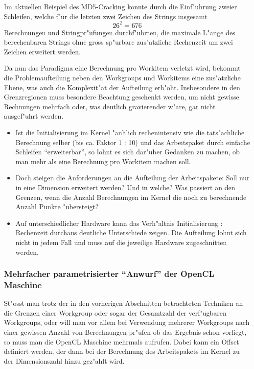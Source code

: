 \begin{refsection}
Im aktuellen Beispiel des MD5-Cracking konnte durch die Einf"uhrung zweier
Schleifen, welche f"ur die letzten zwei Zeichen des Strings insgesamt 
\[ 26^2 = 676 \] Berechnungen und Stringpr"ufungen durchf"uhrten, die 
maximale L"ange des berechenbaren Strings ohne gross sp"urbare zus"atzliche
Rechenzeit um zwei Zeichen erweitert werden.

Da nun das Paradigma eine Berechnung pro Workitem verletzt wird, bekommt
die Problemaufteilung neben den Workgroups und Workitems eine zus"atzliche 
Ebene, was auch die Komplexit"at der Aufteilung erh"oht. Insbesondere in 
den Grenzregionen muss besondere Beachtung geschenkt werden, um nicht
gewisse Rechnungen mehrfach oder, was deutlich gravierender w"are, gar nicht
ausgef"uhrt werden.

\begin{itemize}
 \item Ist die Initialisierung im Kernel "anhlich rechenintensiv wie die
       tats"achliche Berechnung selber (bis ca. Faktor 1 : 10) und das 
       Arbeitspaket durch einfache Schleifen ``erweiterbar'', so lohnt
       es sich dar"uber Gedanken zu machen, ob man mehr als eine Berechnung
       pro Workitem machen soll.
 \item Doch steigen die Anforderungen an die Aufteilung der Arbeitspakete:
       Soll nur in eine Dimension erweitert werden? Und in welche? Was 
       passiert an den Grenzen, wenn die Anzahl Berechnungen im Kernel die 
       noch zu berechnende Anzahl Punkte "ubersteigt?
 \item Auf unterschiedlicher Hardware kann das Verh"altnis Initialisierung : 
       Rechenzeit durchaus deutliche Unterschiede zeigen. Die Aufteilung
       lohnt sich nicht in jedem Fall und muss auf die jeweilige Hardware
       zugeschnitten werden.
\end{itemize}




\subsubsection{Mehrfacher parametrisierter ``Anwurf'' der OpenCL Maschine}

St"osst man trotz der in den vorherigen Abschnitten betrachteten Techniken
an die Grenzen einer Workgroup oder sogar der Gesamtzahl der verf"ugbaren
Workgroups, oder will man vor allem bei Verwendung mehrerer Workgroups 
nach einer gewissen Anzahl von Berechnungen pr"ufen ob das Ergebnis schon
vorliegt, so muss man die OpenCL Maschine mehrmals aufrufen. Dabei kann 
ein Offset definiert werden, der dann bei der Berechnung des Arbeitspakets
im Kernel zu der Dimensionszahl hinzu gez"ahlt wird.


\end{refsection}

